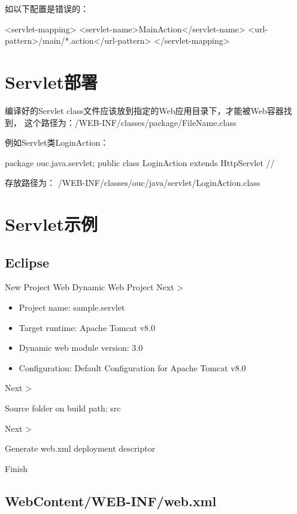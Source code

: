 如以下配置是错误的：

\begin{xmlCode}
<servlet-mapping>
  <servlet-name>MainAction</servlet-name>
  <url-pattern>/main/*.action</url-pattern>
</servlet-mapping>
\end{xmlCode}

\section{Servlet部署}

编译好的Servlet class文件应该放到指定的Web应用目录下，才能被Web容器找到，
这个路径为：{\Red /WEB-INF/classes/package/FileName.class}

例如Servlet类LoginAction：

\begin{javaCode}
package ouc.java.servlet;
public class LoginAction extends HttpServlet {
  //     
}
\end{javaCode}

存放路径为：
{\Blue /WEB-INF/classes/ouc/java/servlet/LoginAction.class}

\section{Servlet示例} 

\subsection{Eclipse}

New Project  Web  Dynamic Web Project  Next >

\begin{itemize}
\item Project name: {\Blue sample.servlet}
\item Target runtime: {\Blue Apache Tomcat v8.0}
\item Dynamic web module version: 3.0
\item Configuration: {\Blue Default Configuration for Apache Tomcat v8.0}
\end{itemize}

 Next >

Source folder on build path: {\Blue src}

 Next >

{\Blue{}} Generate web.xml deployment descriptor

 Finish

\subsection{WebContent/WEB-INF/web.xml}


